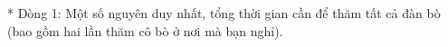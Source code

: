 * Dòng 1: Một số nguyên duy nhất, tổng thời gian cần để thăm tất cả đàn bò (bao gồm hai lần thăm cô bò ở nơi mà bạn nghỉ).